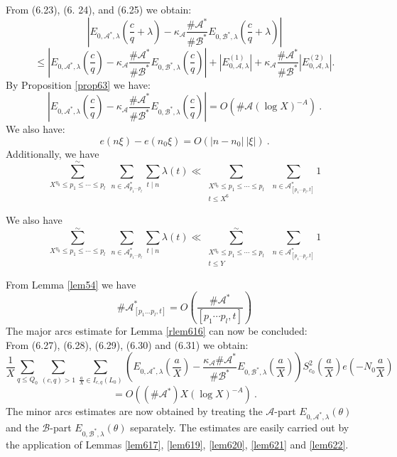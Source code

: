 \documentclass{amsart}
\numberwithin{equation}{subsection}
\begin{document}
From (6.23), (6. 24), and (6.25) we obtain:
\[ 
\left| E_{0, \mathcal{A}^*, \lambda}\left(\frac{c}{q}+\lambda\right)- \kappa_{\mathcal{A}}\frac{\#\mathcal{A}^*}{\#\mathcal{B}^*} E_{0, \mathcal{B}^*, \lambda}\left(\frac{c}{q}+\lambda\right)\right|
 \tag{6.26}
\]
$$\leq \left| E_{0, \mathcal{A}^*, \lambda}\left(\frac{c}{q}\right)-\kappa_{\mathcal{A}}\frac{\#\mathcal{A}^*}{\#\mathcal{B}^*} E_{0, \mathcal{B}^*, \lambda}\left(\frac{c}{q}\right)\right|+|E_{0, \mathcal{A}, \lambda}^{(1)}|+\kappa_{\mathcal{A}}\frac{\#\mathcal{A}^*}{\#\mathcal{B}^*} |E_{0, \mathcal{A}, \lambda}^{(2)}|.$$
By Proposition \ref{prop63} we have:
\[
 \left| E_{0, \mathcal{A}^*, \lambda}\left(\frac{c}{q}\right)-\kappa_{\mathcal{A}}\frac{\#\mathcal{A}^*}{\#\mathcal{B}^*} E_{0, \mathcal{B}^*, \lambda}\left(\frac{c}{q}\right)\right|=O\left( \#\mathcal{A}(\log X)^{-A}\right)\:.  \tag{6.27}
\]
We also have:
\[
e(n\xi)-e(n_0\xi)=O(|n-n_0|\:|\xi|)\:.  \tag{6.28}
\]
Additionally, we have
\[
\sum_{X^{\eta_0}\leq p_1\leq \cdots\leq p_l}^{\sim}\: \sum_{n\in \mathcal{A}^*_{p_1\cdots p_l}} \sum_{t\mid n} \lambda(t)\ll \sum_{\substack{X^{\eta_0}\leq p_1\leq \cdots\leq p_l \\ t\leq X^6}}\ \sum_{n\in \mathcal{A}^*_{[p_1\cdots p_l, t]}} 1 \tag{6.29}
\]

\noindent We also have
\[
\sum_{X^{\eta_0}\leq p_1\leq \cdots\leq p_l}^{\sim}\: \sum_{n\in \mathcal{A}^*_{p_1\cdots p_l}} \sum_{t\mid n} \lambda(t)\ll \sum_{\substack{X^{\eta_0}\leq p_1\leq \cdots\leq p_l \\ t\leq Y}}^{\sim}\ \sum_{n\in \mathcal{A}^*_{[p_1\cdots p_l, t]}} 1  \tag{6.30}
\]

From Lemma \ref{lem54} we have
\[
\# \mathcal{A}^*_{[p_1\ldots p_l, t]} = O\left( \frac{\#\mathcal{A}^*}{[p_1\cdots p_l, t]} \right)  \tag{6.31}
\]
The major arcs estimate for Lemma \ref{rlem616} can now be concluded:\\
From (6.27), (6.28), (6.29), (6.30) and (6.31) we obtain:
$$\frac{1}{X}\sum_{q\leq Q_0}\sum_{(c,q)>1}\sum_{\frac{a}{X}\in I_{c,q}(L_0)} \left( E_{0, \mathcal{A}^*, \lambda}\left(\frac{a}{X}\right) - \frac{\kappa_{\mathcal{A}}\#\mathcal{A}^*}{\#\mathcal{B}^*} E_{0, \mathcal{B}^*, \lambda}\left(\frac{a}{X}\right) \right) S_{c_0}^2\left(\frac{a}{X}\right) e\left(-N_0\frac{a}{X}\right)$$
$$ = O\left(  (\#\mathcal{A}^*) X(\log X)^{-A}\right)\:.$$
The minor arcs estimates are now obtained by treating the $\mathcal{A}$-part $E_{0, \mathcal{A}^*, \lambda}(\theta)$ and the $\mathcal{B}$-part $E_{0, \mathcal{B}^*, \lambda}(\theta)$ separately. The estimates are easily carried out by the application of Lemmas \ref{lem617}, \ref{lem619}, \ref{lem620}, \ref{lem621} and \ref{lem622}.
\end{document}
